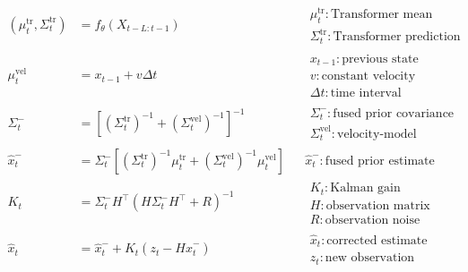 \documentclass[a4paper]{article}
\title{}
\date{}
\begin{document}
    \maketitle
    
    \[
        \begin{aligned}
            (\mu^{\mathrm{tr}}_{t},\Sigma^{\mathrm{tr}}_{t})
		&=
        f_{\theta}(X_{t-L:t-1})
        &&
        \begin{array}{l}
            \mu^{\mathrm{tr}}_{t}: \text{Transformer mean prediction} \\
            \Sigma^{\mathrm{tr}}_{t}: \text{Transformer prediction covariance}
        \end{array}
        \\[8pt]
        \mu^{\mathrm{vel}}_{t}
        &=
        x_{t-1}
        +
        v\Delta t
        &&
        \begin{array}{l}
            x_{t-1}: \text{previous state} \\
            v: \text{constant velocity} \\
            \Delta t: \text{time interval}
        \end{array}
        \\[8pt]
        \Sigma^{-}_{t}
        &=
        \left[
            (\Sigma^{\mathrm{tr}}_{t})^{-1}
            +
            (\Sigma^{\mathrm{vel}}_{t})^{-1}
        \right]^{-1}
        &&
        \begin{array}{l}
            \Sigma^{-}_{t}: \text{fused prior covariance} \\
            \Sigma^{\mathrm{vel}}_{t}: \text{velocity-model covariance}
        \end{array}
        \\[8pt]
        \hat{x}^{-}_{t}
        &=
        \Sigma^{-}_{t}
        \left[
            (\Sigma^{\mathrm{tr}}_{t})^{-1}\mu^{\mathrm{tr}}_{t}
            +
            (\Sigma^{\mathrm{vel}}_{t})^{-1}\mu^{\mathrm{vel}}_{t}
        \right]
        &&
        \hat{x}^{-}_{t}: \text{fused prior estimate}
        \\[8pt]
        K_{t}
        &=
        \Sigma^{-}_{t}H^{\top}
        \left(
            H\Sigma^{-}_{t}H^{\top}
            +
            R
        \right)^{-1}
        &&
        \begin{array}{l}
            K_{t}: \text{Kalman gain} \\
            H: \text{observation matrix} \\
            R: \text{observation noise covariance}
        \end{array}
        \\[8pt]
        \hat{x}_{t}
        &=
        \hat{x}^{-}_{t}
        +
        K_{t}
        \left(
            z_{t}
            -
            H\hat{x}^{-}_{t}
        \right)
        &&
        \begin{array}{l}
            \hat{x}_{t}: \text{corrected estimate} \\
            z_{t}: \text{new observation}
        \end{array}
        \end{aligned}
    \]

%    
%    
\end{document}
